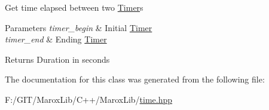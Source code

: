 Get time elapsed between two {\ttfamily \hyperlink{class_marox_1_1_tools_1_1_timer}{Timer}s} 


\begin{DoxyParams}{Parameters}
{\em timer\+\_\+begin} & Initial {\ttfamily \hyperlink{class_marox_1_1_tools_1_1_timer}{Timer}}\\
\hline
{\em timer\+\_\+end} & Ending {\ttfamily \hyperlink{class_marox_1_1_tools_1_1_timer}{Timer}}\\
\hline
\end{DoxyParams}
\begin{DoxyReturn}{Returns}
Duration in {\ttfamily seconds}
\end{DoxyReturn}


The documentation for this class was generated from the following file\+:\begin{DoxyCompactItemize}
\item 
F\+:/\+G\+I\+T/\+Marox\+Lib/\+C++/\+Marox\+Lib/\hyperlink{time_8hpp}{time.\+hpp}\end{DoxyCompactItemize}
